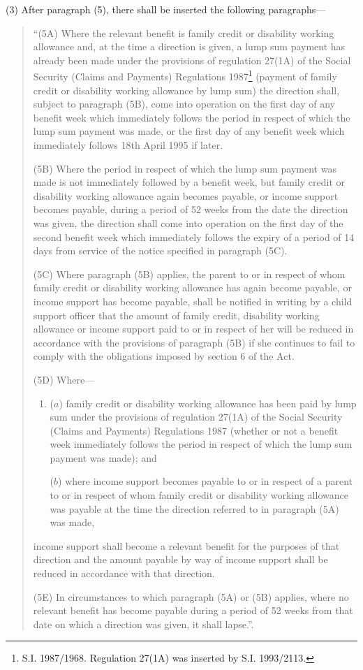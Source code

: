 \documentclass[12pt,a4paper]{article}
\begin{document}
(3) After paragraph (5), there shall be inserted the following paragraphs—
\begin{quotation}
“(5A) Where the relevant benefit is family credit or disability working allowance and, at the time a direction is given, a lump sum payment has already been made under the provisions of regulation 27(1A) of the Social Security (Claims and Payments) Regulations 1987\footnote{\frenchspacing S.I. 1987/1968. Regulation 27(1A) was inserted by S.I. 1993/2113.} (payment of family credit or disability working allowance by lump sum) the direction shall, subject to paragraph (5B), come into operation on the first day of any benefit week which immediately follows the period in respect of which the lump sum payment was made, or the first day of any benefit week which immediately follows 18th April 1995 if later.

(5B) Where the period in respect of which the lump sum payment was made is not immediately followed by a benefit week, but family credit or disability working allowance again becomes payable, or income support becomes payable, during a period of 52 weeks from the date the direction was given, the direction shall come into operation on the first day of the second benefit week which immediately follows the expiry of a period of 14 days from service of the notice specified in paragraph (5C).

(5C) Where paragraph (5B) applies, the parent to or in respect of whom family credit or disability working allowance has again become payable, or income support has become payable, shall be notified in writing by a child support officer that the amount of family credit, disability working allowance or income support paid to or in respect of her will be reduced in accordance with the provisions of paragraph (5B) if she continues to fail to comply with the obligations imposed by section 6 of the Act.

(5D) Where—
\begin{enumerate}\item[]
($a$) family credit or disability working allowance has been paid by lump sum under the provisions of regulation 27(1A) of the Social Security (Claims and Payments) Regulations 1987 (whether or not a benefit week immediately follows the period in respect of which the lump sum payment was made); and

($b$) where income support becomes payable to or in respect of a parent to or in respect of whom family credit or disability working allowance was payable at the time the direction referred to in paragraph (5A) was made, 
\end{enumerate}
income support shall become a relevant benefit for the purposes of that direction and the amount payable by way of income support shall be reduced in accordance with that direction.

(5E) In circumstances to which paragraph (5A) or (5B) applies, where no relevant benefit has become payable during a period of 52 weeks from that date on which a direction was given, it shall lapse.”.
\end{quotation}
\end{document}
